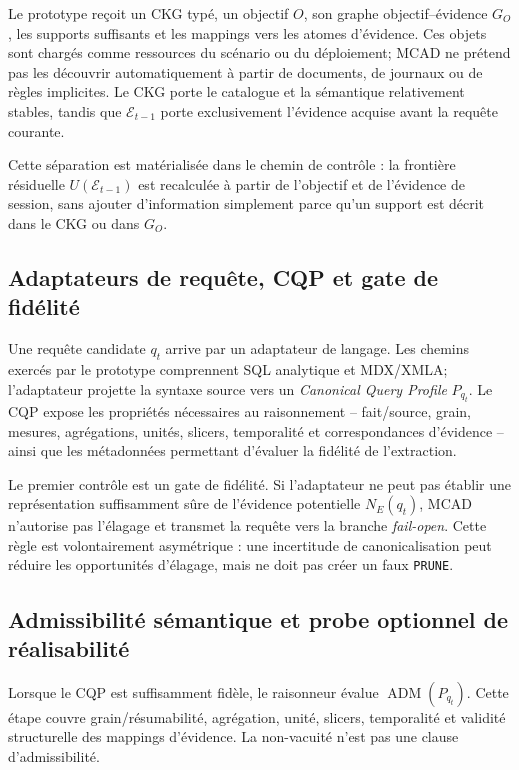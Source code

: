 \documentclass[journal]{IEEEtran}
\begin{document}
Le prototype reçoit un CKG typé, un objectif $O$, son graphe objectif--évidence $G_O$, les supports suffisants et les mappings vers les atomes d'évidence. Ces objets sont chargés comme ressources du scénario ou du déploiement; MCAD ne prétend pas les découvrir automatiquement à partir de documents, de journaux ou de règles implicites. Le CKG porte le catalogue et la sémantique relativement stables, tandis que $\mathcal{E}_{t-1}$ porte exclusivement l'évidence acquise avant la requête courante.

Cette séparation est matérialisée dans le chemin de contrôle : la frontière résiduelle $U(\mathcal{E}_{t-1})$ est recalculée à partir de l'objectif et de l'évidence de session, sans ajouter d'information simplement parce qu'un support est décrit dans le CKG ou dans $G_O$.

\subsection{Adaptateurs de requête, CQP et gate de fidélité}

Une requête candidate $q_t$ arrive par un adaptateur de langage. Les chemins exercés par le prototype comprennent SQL analytique et MDX/XMLA; l'adaptateur projette la syntaxe source vers un \emph{Canonical Query Profile} $P_{q_t}$. Le CQP expose les propriétés nécessaires au raisonnement -- fait/source, grain, mesures, agrégations, unités, slicers, temporalité et correspondances d'évidence -- ainsi que les métadonnées permettant d'évaluer la fidélité de l'extraction.

Le premier contrôle est un gate de fidélité. Si l'adaptateur ne peut pas établir une représentation suffisamment sûre de l'évidence potentielle $N_E(q_t)$, MCAD n'autorise pas l'élagage et transmet la requête vers la branche \emph{fail-open}. Cette règle est volontairement asymétrique : une incertitude de canonicalisation peut réduire les opportunités d'élagage, mais ne doit pas créer un faux \texttt{PRUNE}.

\subsection{Admissibilité sémantique et probe optionnel de réalisabilité}

Lorsque le CQP est suffisamment fidèle, le raisonneur évalue $\operatorname{ADM}(P_{q_t})$. Cette étape couvre grain/résumabilité, agrégation, unité, slicers, temporalité et validité structurelle des mappings d'évidence. La non-vacuité n'est pas une clause d'admissibilité.
\end{document}
